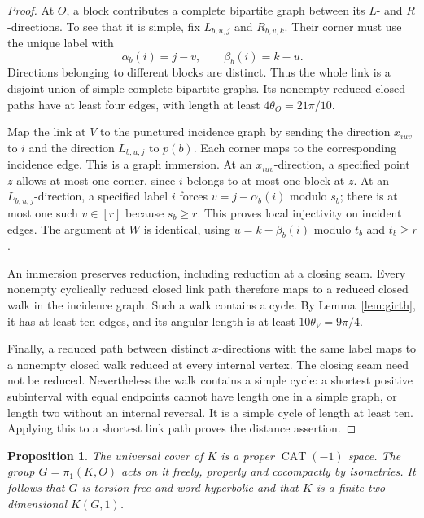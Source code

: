 \documentclass[11pt]{amsart}
\newtheorem{proposition}[theorem]{Proposition}
\theoremstyle{definition}
\theoremstyle{remark}
\numberwithin{equation}{section}
\newcommand{\CAT}{\operatorname{CAT}}
\begin{document}
\begin{proof}
At $O$, a block contributes a complete bipartite graph between its
$L$- and $R$-directions. To see that it is simple, fix
$L_{b,u,j}$ and $R_{b,v,k}$. Their corner must use the unique label
with
\[
 \alpha_b(i)=j-v,\qquad \beta_b(i)=k-u.
\]
Directions belonging to different blocks are distinct. Thus the
whole link is a disjoint union of simple complete bipartite graphs.
Its nonempty reduced closed paths have at least four edges, with
length at least $4\theta_O=21\pi/10$.

Map the link at $V$ to the punctured incidence graph by sending
the direction $x_{iuv}$ to $i$ and the direction $L_{b,u,j}$ to
$p(b)$. Each corner maps to the corresponding incidence edge.
This is a graph immersion. At an $x_{iuv}$-direction, a specified
point $z$ allows at most one corner, since $i$ belongs to at most
one block at $z$. At an $L_{b,u,j}$-direction, a specified label
$i$ forces $v=j-\alpha_b(i)$ modulo $s_b$; there is at most one such
$v\in[r]$ because $s_b\ge r$. This proves local injectivity on
incident edges. The argument at $W$ is identical, using
$u=k-\beta_b(i)$ modulo $t_b$ and $t_b\ge r$.

An immersion preserves reduction, including reduction at a closing
seam. Every nonempty cyclically reduced closed link path therefore
maps to a reduced closed walk in the incidence graph. Such a walk
contains a cycle. By Lemma~\ref{lem:girth}, it has at least ten
edges, and its angular length is at least
$10\theta_V=9\pi/4$.

Finally, a reduced path between distinct $x$-directions with the
same label maps to a nonempty closed walk reduced at every internal
vertex. The closing seam need not be reduced. Nevertheless the
walk contains a simple cycle: a shortest positive subinterval with
equal endpoints cannot have length one in a simple graph, or length
two without an internal reversal. It is a simple cycle of length
at least ten. Applying this to a shortest link path proves the
distance assertion.
\end{proof}

\begin{proposition}\label{prop:cat}
The universal cover of $K$ is a proper $\CAT(-1)$ space. The group
$G=\pi_1(K,O)$ acts on it freely, properly and cocompactly by
isometries. It follows that $G$ is torsion-free and word-hyperbolic
and that $K$ is a finite two-dimensional $K(G,1)$.
\end{proposition}
\end{document}
